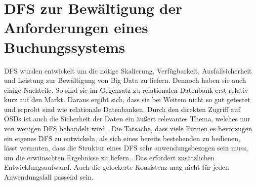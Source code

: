 \documentclass[12pt,oneside,a4paper,parskip]{scrbook}
\begin{document}
\section{DFS zur Bewältigung der Anforderungen eines Buchungssystems}
DFS wurden entwickelt um die nötige Skalierung, Verfügbarkeit, Ausfallsicherheit und Leistung zur Bewältigung von Big Data zu liefern. Dennoch haben sie auch einige Nachteile. So sind sie im Gegensatz zu relationalen Datenbank erst relativ kurz auf den Markt. Daraus ergibt sich, dass sie bei Weitem nicht so gut getestet und erprobt sind wie relationale Datenbanken. Durch den direkten Zugriff auf OSDs ist auch die Sicherheit der Daten ein äußert relevantes Thema, welches nur von wenigen DFS behandelt wird \cite{dfsDrawbacks}\cite{cephDrawbacks}. Die Tatsache, dass viele Firmen es bevorzugen ein eigenes DFS zu entwickeln, als sich eines bereits bestehenden zu bedienen, lässt vermuten, dass die Struktur eines DFS sehr anwendungsbezogen sein muss, um die erwünschten Ergebnisse zu liefern \cite{GFS}\cite{haystack}. Das erfordert zusätzlichen Entwicklungsaufwand. Auch die gelockerte Konsistenz mag nicht für jeden Anwendungsfall passend sein. 
\end{document}
